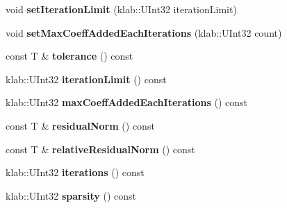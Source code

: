 \begin{DoxyCompactItemize}
\item 
void {\bfseries set\+Iteration\+Limit} (klab\+::\+U\+Int32 iteration\+Limit)\hypertarget{classkl1p_1_1TROMPSolver_a665ca9a8a9d23dc267c84d0a12060d3d}{}\label{classkl1p_1_1TROMPSolver_a665ca9a8a9d23dc267c84d0a12060d3d}

\item 
void {\bfseries set\+Max\+Coeff\+Added\+Each\+Iterations} (klab\+::\+U\+Int32 count)\hypertarget{classkl1p_1_1TROMPSolver_aca03154566c094c71e567e788e727ba8}{}\label{classkl1p_1_1TROMPSolver_aca03154566c094c71e567e788e727ba8}

\item 
const T \& {\bfseries tolerance} () const \hypertarget{classkl1p_1_1TROMPSolver_a9ffe1e1845267ca1c547606e47db64dc}{}\label{classkl1p_1_1TROMPSolver_a9ffe1e1845267ca1c547606e47db64dc}

\item 
klab\+::\+U\+Int32 {\bfseries iteration\+Limit} () const \hypertarget{classkl1p_1_1TROMPSolver_a185efb0835100d180883b530d5b493b3}{}\label{classkl1p_1_1TROMPSolver_a185efb0835100d180883b530d5b493b3}

\item 
klab\+::\+U\+Int32 {\bfseries max\+Coeff\+Added\+Each\+Iterations} () const \hypertarget{classkl1p_1_1TROMPSolver_af3753ae8a81d866d86ea6307e91eca3f}{}\label{classkl1p_1_1TROMPSolver_af3753ae8a81d866d86ea6307e91eca3f}

\item 
const T \& {\bfseries residual\+Norm} () const \hypertarget{classkl1p_1_1TROMPSolver_a177485036f07a091716a2b4c6dbf7142}{}\label{classkl1p_1_1TROMPSolver_a177485036f07a091716a2b4c6dbf7142}

\item 
const T \& {\bfseries relative\+Residual\+Norm} () const \hypertarget{classkl1p_1_1TROMPSolver_abaeb059a69272aa4032243edee4f186d}{}\label{classkl1p_1_1TROMPSolver_abaeb059a69272aa4032243edee4f186d}

\item 
klab\+::\+U\+Int32 {\bfseries iterations} () const \hypertarget{classkl1p_1_1TROMPSolver_a2bbaed8b9966361c739ced2aad2ce83b}{}\label{classkl1p_1_1TROMPSolver_a2bbaed8b9966361c739ced2aad2ce83b}

\item 
klab\+::\+U\+Int32 {\bfseries sparsity} () const \hypertarget{classkl1p_1_1TROMPSolver_ac89d719bb6c6821ca565c31a2bc17215}{}\label{classkl1p_1_1TROMPSolver_ac89d719bb6c6821ca565c31a2bc17215}


\end{DoxyCompactItemize}
